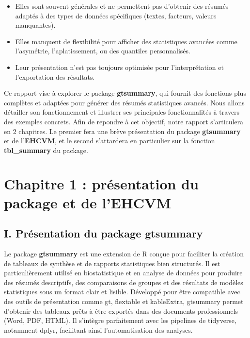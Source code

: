 \documentclass[
]{article}
\begin{document}
\begin{itemize}
\item
  Elles sont souvent générales et ne permettent pas d'obtenir des
  résumés adaptés à des types de données spécifiques (textes, facteurs,
  valeurs manquantes).
\item
  Elles manquent de flexibilité pour afficher des statistiques avancées
  comme l'asymétrie, l'aplatissement, ou des quantiles personnalisés.
\item
  Leur présentation n'est pas toujours optimisée pour l'interprétation
  et l'exportation des résultats.
\end{itemize}

Ce rapport vise à explorer le package \textbf{gtsummary}, qui fournit
des fonctions plus complètes et adaptées pour générer des résumés
statistiques avancés. Nous allons détailler son fonctionnement et
illustrer ses principales fonctionnalités à travers des exemples
concrets. Afin de repondre à cet objectif, notre rapport s'articulera en
2 chapitres. Le premier fera une brève présentation du package
\textbf{gtsummary} et de l'\textbf{EHCVM}, et le second s'attardera en
particulier sur la fonction \textbf{tbl\_summary} du package.

\newpage

\section*{Chapitre 1 : présentation du package et de l'EHCVM}

\subsection{I. Présentation du package
gtsummary}\label{i.-pruxe9sentation-du-package-gtsummary}

Le package \textbf{gtsummary} est une extension de R conçue pour
faciliter la création de tableaux de synthèse et de rapports
statistiques bien structurés. Il est particulièrement utilisé en
biostatistique et en analyse de données pour produire des résumés
descriptifs, des comparaisons de groupes et des résultats de modèles
statistiques sous un format clair et lisible. Développé pour être
compatible avec des outils de présentation comme gt, flextable et
kableExtra, gtsummary permet d'obtenir des tableaux prêts à être
exportés dans des documents professionnels (Word, PDF, HTML). Il
s'intègre parfaitement avec les pipelines de tidyverse, notamment dplyr,
facilitant ainsi l'automatisation des analyses.
\end{document}
